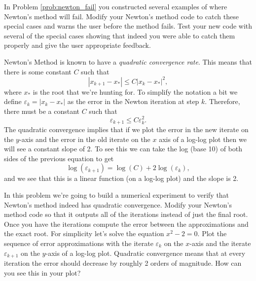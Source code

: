 \begin{problem}
    In Problem \ref{prob:newton_fail} you constructed several examples of where Newton's
    method will fail.  Modify your Newton's method code
    to catch these special cases and warns the user before the method fails.  Test your
    new code with several of the special cases showing that indeed you were able to catch
    them properly and give the user appropriate feedback.
\end{problem}


\begin{problem}\label{prob:newton_convergence}
    Newton's Method is known to have a {\it quadratic convergence rate}.  This means that
    there is some constant $C$ such that 
    \[ |x_{k+1} - x_*| \leq C |x_{k} - x_*|^2, \]
    where $x_*$ is the root that we're hunting for.  
    To simplify the notation a bit we define $\varepsilon_{k} = |x_k - x_*|$ as the error
    in the Newton iteration at step $k$.  Therefore, there must be a constant $C$ such
    that 
    \[ \varepsilon_{k+1} \leq C \varepsilon_k^2. \]
    The quadratic convergence implies that
    if we plot the error in the new iterate on the $y$-axis and the error in the old
    iterate on the $x$ axis of a log-log plot then we will see a constant slope of 2.
    To see this we can take the log (base 10) of both sides of the previous equation to
    get 
    \[ \log(\varepsilon_{k+1}) = \log(C) + 2 \log(\varepsilon_k), \]
    and we see that this is a linear function (on a log-log plot) and the slope is 2.
    
    In this problem we're going to build a numerical experiment to verify that Newton's
    method indeed has quadratic convergence.  Modify your Newton's method code so that it
    outputs all of the iterations instead of just the final root.  Once you have the
    iterations compute the error between the approximations and the exact root. For
    simplicity let's solve the equation $x^2-2=0$.  Plot the sequence of error
    approximations with the iterate $\varepsilon_k$ on the $x$-axis and the iterate
    $\varepsilon_{k+1}$ on the
    $y$-axis of a log-log plot.  
    Quadratic convergence means that at every iteration the
    error should decrease by roughly 2 orders of magnitude.  How can you see this in your
    plot?
\end{problem}


